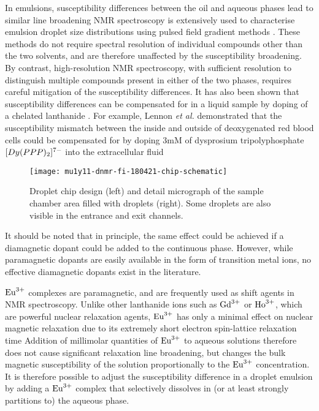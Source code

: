 In emulsions, susceptibility differences between the oil and aqueous phases
lead to similar line broadening \citep{Kuchel:2003ip} NMR spectroscopy is extensively
used to characterise emulsion droplet size distributions using pulsed
field gradient methods \citep{VANDENENDEN:1990ck,FOUREL:1994jv,
Hollingsworth:2004iy,Hindmarsh:2005en,Johns:2009ib,Bernewitz:2011km,Lingwood:2012je}.
These methods do not require spectral resolution of individual
compounds other than the two solvents, and are therefore
unaffected by the susceptibility broadening. By contrast, high-resolution
NMR spectroscopy, with sufficient resolution to distinguish multiple
compounds present in either of the two phases,
requires careful mitigation of the susceptibility differences. It has also been shown that susceptibility differences can
be compensated for in a liquid sample by doping of a chelated lanthanide \citep{fabry1983effect}.
For example, Lennon \emph{et al.} demonstrated that the susceptibility mismatch between the inside and outside of deoxygenated red blood cells could be
compensated for by doping 3mM of dysprosium tripolyphosphate $\ce[{Dy(PPP)_2}]^{7-}$ into the extracellular fluid \citep{lennon1994hemoglobin}

\begin{figure}
  \begin{center}
    \texttt{[image: mu1y11-dnmr-fi-180421-chip-schematic]}
  \end{center}
  \caption{Droplet chip design (left) and detail micrograph of the sample chamber
  area filled with droplets (right). Some droplets are also visible in the
  entrance and exit channels.}
  \label{fig:chip-design}
\end{figure}

It should be noted that in principle, the same effect could be achieved if
a diamagnetic dopant could be added to the continuous phase. However, while paramagnetic
dopants are easily available in the form of transition metal ions, no
effective diamagnetic dopants exist in the literature.

$\ce{Eu^{3+}}$ complexes are paramagnetic, and are frequently used as
shift agents in NMR spectroscopy. Unlike other lanthanide ions such
as $\ce{Gd^{3+}}$ or $\ce{Ho^{3+}}$, which are powerful nuclear relaxation
agents, $\ce{Eu^{3+}}$ has only a minimal
effect on nuclear magnetic relaxation due to its extremely
short electron spin-lattice relaxation time \citep{Peters:1996bj} Addition of
millimolar quantities of $\ce{Eu^{3+}}$ to aqueous solutions
therefore does not cause significant relaxation line broadening, but changes
the bulk magnetic susceptibility of the solution proportionally
to the $\ce{Eu^{3+}}$ concentration. It is therefore possible
to adjust the susceptibility difference in a droplet emulsion
by adding a $\ce{Eu^{3+}}$ complex that selectively dissolves in (or at least
strongly partitions to) the aqueous phase.


